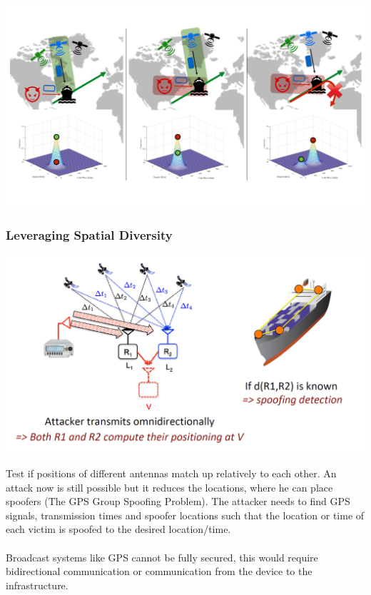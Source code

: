 \begin{minipage}{\linewidth}
    \centering      
    \includegraphics[width=0.9\linewidth]{Figures/L4_spree.PNG} 
\end{minipage}

\subsubsection{Leveraging Spatial Diversity}
\begin{minipage}{\linewidth}
    \centering      
    \includegraphics[width=0.9\linewidth]{Figures/L4_spatial.PNG} 
\end{minipage}

Test if positions of different antennas match up relatively to each other.
An attack now is still possible but it reduces the locations, where he can place spoofers (The GPS Group Spoofing Problem). The attacker needs to find GPS signals, transmission times and spoofer locations such that the location or time of each victim is spoofed to the desired location/time.
\\\\
Broadcast systems like GPS cannot be fully secured, this would require bidirectional communication or communication from the device to the infrastructure.


